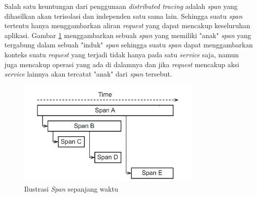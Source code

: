 Salah satu keuntungan dari penggunaan \textit{distributed tracing} adalah \textit{span} yang dihasilkan akan terisolasi dan independen satu sama lain. Sehingga suatu \textit{span} tertentu hanya menggambarkan aliran \textit{request} yang dapat mencakup keseluruhan aplikasi. Gambar \ref{ch2-span} menggambarkan sebuah \textit{span} yang memiliki "anak" \textit{span} yang tergabung dalam sebuah "induk" \textit{span} sehingga suatu \textit{span} dapat menggambarkan konteks suatu \textit{request} yang terjadi tidak hanya pada satu \textit{service} saja, namun juga mencakup operasi yang ada di dalamnya dan jika \textit{request} mencakup aksi \textit{service} lainnya akan tercatat "anak" dari \textit{span} tersebut.
\begin{figure}[htb]
	\centering
	\includegraphics[width=0.8\textwidth]{resources/ch2/trace-ilus-2.png}
	\caption{Ilustrasi \textit{Span} sepanjang waktu \citep{bento2021}}
	\label{ch2-span}
\end{figure}


